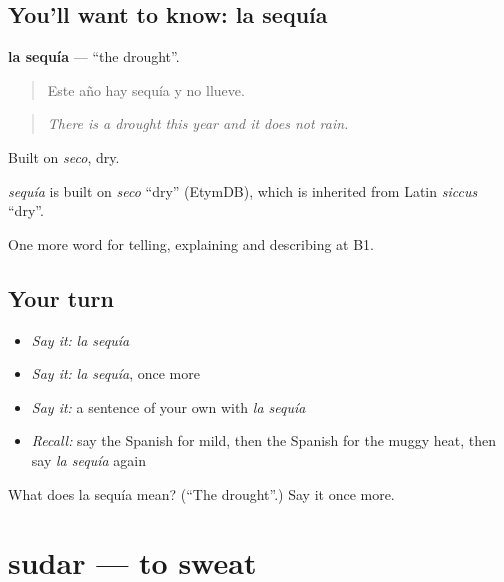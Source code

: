 \subsection*{You'll want to know: la sequía}
\textbf{la sequía} — \textquotedblleft{}the drought\textquotedblright{}.

\begin{quote}
Este año hay sequía y no llueve.
\end{quote}

\begin{quote}
\emph{There is a drought this year and it does not rain.}
\end{quote}

Built on \emph{seco}, dry.

\begin{cousinweb}
\emph{sequía} is built on \emph{seco} \textquotedblleft{}dry\textquotedblright{} (EtymDB), which is inherited from Latin \emph{siccus} \textquotedblleft{}dry\textquotedblright{}.
\end{cousinweb}

\begin{grammarlens}[title={What you've built}]
One more word for telling, explaining and describing at B1.
\end{grammarlens}

\subsection*{Your turn}
\begin{itemize}
\raggedright
  \item \emph{Say it:} \emph{la sequía}
  \item \emph{Say it:} \emph{la sequía}, once more
  \item \emph{Say it:} a sentence of your own with \emph{la sequía}
  \item \emph{Recall:} say the Spanish for mild, then the Spanish for the muggy heat, then say \emph{la sequía} again
\end{itemize}

\begin{tcolorbox}[breakable,colback=teal!4,colframe=teal!35!black,title={Before you move on}]
What does la sequía mean? (\textquotedblleft{}The drought\textquotedblright{}.) Say it once more.
\end{tcolorbox}
\section[sudar]{sudar — to sweat}

